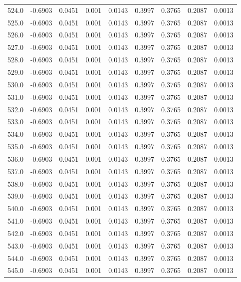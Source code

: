 \begin{longtable}{lrrrrrrrr}
524.0 & -0.6903 & 0.0451 & 0.001 & 0.0143 & 0.3997 & 0.3765 & 0.2087 & 0.0013 \\
525.0 & -0.6903 & 0.0451 & 0.001 & 0.0143 & 0.3997 & 0.3765 & 0.2087 & 0.0013 \\
526.0 & -0.6903 & 0.0451 & 0.001 & 0.0143 & 0.3997 & 0.3765 & 0.2087 & 0.0013 \\
527.0 & -0.6903 & 0.0451 & 0.001 & 0.0143 & 0.3997 & 0.3765 & 0.2087 & 0.0013 \\
528.0 & -0.6903 & 0.0451 & 0.001 & 0.0143 & 0.3997 & 0.3765 & 0.2087 & 0.0013 \\
529.0 & -0.6903 & 0.0451 & 0.001 & 0.0143 & 0.3997 & 0.3765 & 0.2087 & 0.0013 \\
530.0 & -0.6903 & 0.0451 & 0.001 & 0.0143 & 0.3997 & 0.3765 & 0.2087 & 0.0013 \\
531.0 & -0.6903 & 0.0451 & 0.001 & 0.0143 & 0.3997 & 0.3765 & 0.2087 & 0.0013 \\
532.0 & -0.6903 & 0.0451 & 0.001 & 0.0143 & 0.3997 & 0.3765 & 0.2087 & 0.0013 \\
533.0 & -0.6903 & 0.0451 & 0.001 & 0.0143 & 0.3997 & 0.3765 & 0.2087 & 0.0013 \\
534.0 & -0.6903 & 0.0451 & 0.001 & 0.0143 & 0.3997 & 0.3765 & 0.2087 & 0.0013 \\
535.0 & -0.6903 & 0.0451 & 0.001 & 0.0143 & 0.3997 & 0.3765 & 0.2087 & 0.0013 \\
536.0 & -0.6903 & 0.0451 & 0.001 & 0.0143 & 0.3997 & 0.3765 & 0.2087 & 0.0013 \\
537.0 & -0.6903 & 0.0451 & 0.001 & 0.0143 & 0.3997 & 0.3765 & 0.2087 & 0.0013 \\
538.0 & -0.6903 & 0.0451 & 0.001 & 0.0143 & 0.3997 & 0.3765 & 0.2087 & 0.0013 \\
539.0 & -0.6903 & 0.0451 & 0.001 & 0.0143 & 0.3997 & 0.3765 & 0.2087 & 0.0013 \\
540.0 & -0.6903 & 0.0451 & 0.001 & 0.0143 & 0.3997 & 0.3765 & 0.2087 & 0.0013 \\
541.0 & -0.6903 & 0.0451 & 0.001 & 0.0143 & 0.3997 & 0.3765 & 0.2087 & 0.0013 \\
542.0 & -0.6903 & 0.0451 & 0.001 & 0.0143 & 0.3997 & 0.3765 & 0.2087 & 0.0013 \\
543.0 & -0.6903 & 0.0451 & 0.001 & 0.0143 & 0.3997 & 0.3765 & 0.2087 & 0.0013 \\
544.0 & -0.6903 & 0.0451 & 0.001 & 0.0143 & 0.3997 & 0.3765 & 0.2087 & 0.0013 \\
545.0 & -0.6903 & 0.0451 & 0.001 & 0.0143 & 0.3997 & 0.3765 & 0.2087 & 0.0013 \\

\end{longtable}
